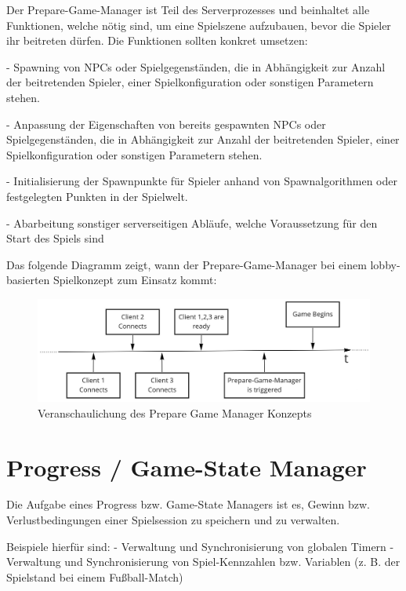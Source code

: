 Der Prepare-Game-Manager ist Teil des Serverprozesses und beinhaltet alle Funktionen, welche nötig sind, um eine Spielszene aufzubauen, bevor die Spieler ihr beitreten dürfen. Die Funktionen sollten konkret umsetzen:

- Spawning \cite{Wikipedia.2020} von NPCs \cite{Wikipedia.2021f} oder Spielgegenständen, die in Abhängigkeit zur Anzahl der beitretenden Spieler, einer Spielkonfiguration oder sonstigen Parametern stehen.

- Anpassung der Eigenschaften von bereits gespawnten NPCs oder Spielgegenständen, die in Abhängigkeit zur Anzahl der beitretenden Spieler, einer Spielkonfiguration oder sonstigen Parametern stehen.

- Initialisierung der Spawnpunkte für Spieler anhand von Spawnalgorithmen oder festgelegten Punkten in der Spielwelt.

- Abarbeitung sonstiger serverseitigen Abläufe, welche Voraussetzung für den Start des Spiels sind

Das folgende Diagramm zeigt, wann der Prepare-Game-Manager bei einem lobby-basierten Spielkonzept zum Einsatz kommt:

\begin{figure}[H]
	\centering
	\includegraphics[width=150mm]{images/prepare_game_manager.jpg}
	\caption[Prepare-Game-Manager]{Veranschaulichung des Prepare Game Manager Konzepts}
	\label{pic:prepare_game_manager}
\end{figure}

\section{Progress / Game-State Manager}
\label{progress_manager}

Die Aufgabe eines Progress bzw. Game-State Managers ist es, Gewinn bzw. Verlustbedingungen einer Spielsession zu speichern und zu verwalten. 

Beispiele hierfür sind:
- Verwaltung und Synchronisierung von globalen Timern
- Verwaltung und Synchronisierung von Spiel-Kennzahlen bzw. Variablen (z. B. der Spielstand bei einem Fußball-Match)


